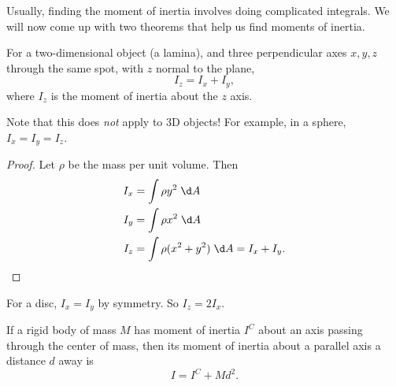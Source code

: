 \documentclass[a4paper]{article}
\begin{document}
Usually, finding the moment of inertia involves doing complicated integrals. We will now come up with two theorems that help us find moments of inertia.
\begin{thm}
  For a two-dimensional object (a lamina), and three perpendicular axes $x, y, z$ through the same spot, with $z$ normal to the plane,
  \[
    I_z = I_x + I_y,
  \]
  where $I_z$ is the moment of inertia about the $z$ axis.
  \begin{center}
  \end{center}
\end{thm}
Note that this does \emph{not} apply to 3D objects! For example, in a sphere, $I_x = I_y = I_z$.

\begin{proof}
  Let $\rho$ be the mass per unit volume. Then
  \begin{align*}
    I_x &= \int \rho y^2 \;\d A\\
    I_y &= \int \rho x^2 \;\d A\\
    I_z &= \int \rho (x^2 + y^2)\;\d A = I_x + I_y.\qedhere
  \end{align*}
\end{proof}

\begin{eg}
  For a disc, $I_x = I_y$ by symmetry. So $I_z = 2 I_x$.
\end{eg}

\begin{thm}
  If a rigid body of mass $M$ has moment of inertia $I^C$ about an axis passing through the center of mass, then its moment of inertia about a parallel axis a distance $d$ away is
  \[
    I = I^C + Md^2.
  \]
  \begin{center}
  \end{center}
\end{thm}
\end{document}
